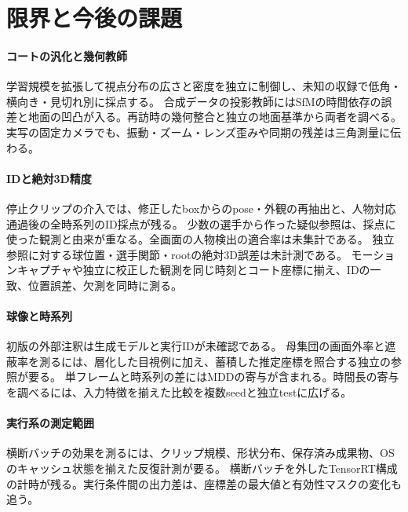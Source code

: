 \section{限界と今後の課題}
\label{sec:limitations}

\paragraph{コートの汎化と幾何教師}
学習規模を拡張して視点分布の広さと密度を独立に制御し、未知の収録で低角・横向き・見切れ別に採点する。
合成データの投影教師にはSfMの時間依存の誤差と地面の凹凸が入る。再訪時の幾何整合と独立の地面基準から両者を調べる。
実写の固定カメラでも、振動・ズーム・レンズ歪みや同期の残差は三角測量に伝わる。

\paragraph{IDと絶対3D精度}
停止クリップの介入では、修正したboxからのpose・外観の再抽出と、人物対応通過後の全時系列のID採点が残る。
少数の選手から作った疑似参照は、採点に使った観測と由来が重なる。全画面の人物検出の適合率は未集計である。
独立参照に対する球位置・選手関節・rootの絶対3D誤差は未計測である。
モーションキャプチャや独立に校正した観測を同じ時刻とコート座標に揃え、IDの一致、位置誤差、欠測を同時に測る。

\paragraph{球像と時系列}
初版の外部注釈は生成モデルと実行IDが未確認である。
母集団の画面外率と遮蔽率を測るには、層化した目視例に加え、蓄積した推定座標を照合する独立の参照が要る。
単フレームと時系列の差にはMDDの寄与が含まれる。時間長の寄与を調べるには、入力特徴を揃えた比較を複数seedと独立testに広げる。

\paragraph{実行系の測定範囲}
横断バッチの効果を測るには、クリップ規模、形状分布、保存済み成果物、OSのキャッシュ状態を揃えた反復計測が要る。
横断バッチを外したTensorRT構成の計時が残る。実行条件間の出力差は、座標差の最大値と有効性マスクの変化も追う。
